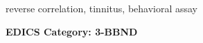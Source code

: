 \documentclass[journal]{IEEEtran}
\begin{document}
\begin{abstract}
\end{abstract}

\begin{IEEEkeywords}
    reverse correlation, tinnitus, behavioral assay
\end{IEEEkeywords}

\ifCLASSOPTIONpeerreview
\begin{center} \bfseries EDICS Category: 3-BBND \end{center}
\fi
%
\IEEEpeerreviewmaketitle
\end{document}
